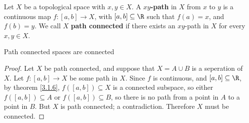 \begin{definition}
    Let $X$ be a topological space with  $x, y \in X$. A \textbf{$xy$-path} in $X$ from  $x$ to  $y$ is a
    continuous map  $f:[a,b] \rightarrow X$, with $[a,b] \subseteq \R$ such that $f(a)=x$, and
    $f(b)=y$. We call $X$ \textbf {path connected} if there exists an $xy$-path in $X$ for every
    $x,y \in X$.
\end{definition}

\begin{theorem}\label{3.2.3}
    Path connected spaces are connected
\end{theorem}
\begin{proof}
    Let $X$ be path connected, and suppose that  $X=A \cup B$ is a seperation of  $X$. Let  $f:[a,b]
    \rightarrow X$ be some path in $X$. Since  $f$ is continuous, and  $[a,b] \subseteq \R$, by
    theorem \ref{3.1.6}, $f([a,b]) \subseteq X$ is a connected subspace, so either $f([a,b])
    \subseteq A$ or $f([a,b]) \subseteq B$, so there is no path from a point in $A$ to a point in
    $B$. But  $X$ is path connected; a contradiction. Therefore  $X$ must be connected.
\end{proof}


